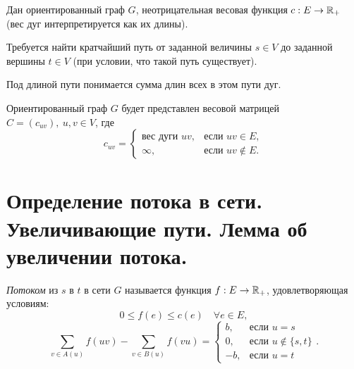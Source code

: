 \begin{note}[ТГ постановка]
    Дан ориентированный граф $ G $, неотрицательная весовая функция $ c: E \rightarrow \mathbb{R}_+ $ (вес дуг интерпретируется как их длины).

    Требуется найти кратчайший путь от заданной величины $ s \in V $ до заданной вершины $ t \in V $ (при условии, что такой путь существует).
\end{note}

\begin{remark}
    Под длиной пути понимается сумма длин всех в этом пути дуг.
\end{remark}

\begin{note}
    Ориентированный граф $ G $ будет представлен весовой матрицей $ C = (c_{uv}), \ u,v \in V $, где
    \[
        c_{uv} = \left\{\begin{array}{ll}
            \text{вес дуги }uv, & \text{если }uv \in E,     \\
            \infty,             & \text{если } uv \notin E.
        \end{array}\right.
    \]
    \begin{figure}[H]
        \centering
        \label{fig:fig_31}
    \end{figure}
\end{note}

\section{Определение потока в сети. Увеличивающие пути. Лемма об увеличении потока.}

\begin{definition}
    \emph{Потоком} из $ s $ в $ t $ в сети $ G $ называется функция $ f: E \rightarrow \mathbb{R}_+ $, удовлетворяющая условиям:
    \begin{equation}\label{eq:3}
        0 \leqslant f(e) \leqslant c(e) \quad \forall e \in E,
    \end{equation}
    \begin{equation}\label{eq:4}
        \sum_{v\in A(u)}f(uv) - \sum_{v\in B(u)}f(vu) = \left\{\begin{array}{ll}
            b,  & \text{если }u = s            \\
            0,  & \text{если }u \notin \{s,t\} \\
            -b, & \text{если }u = t
        \end{array}\right..
    \end{equation}
\end{definition}

